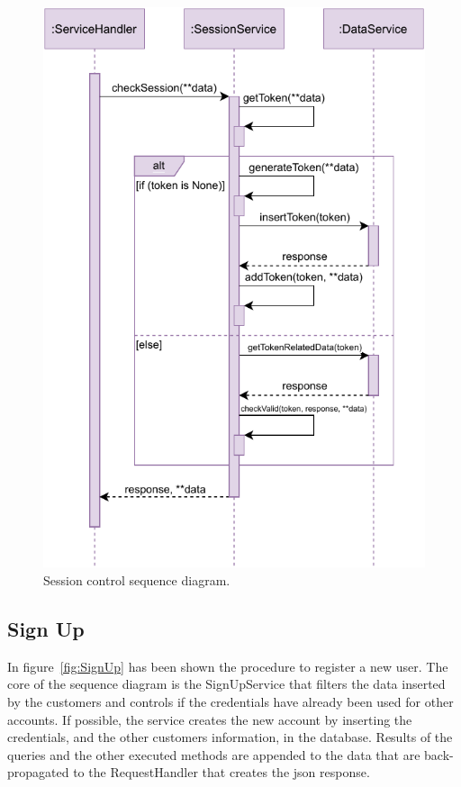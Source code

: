 \begin{figure}[H]
    \centering
    \includegraphics[width=1.0\textwidth]{images/sessionToken_sequence_diagram.pdf}
    \caption{Session control sequence diagram.}\label{fig:SessControl}
\end{figure}

\subsection{Sign Up}

In figure~\ref{fig:SignUp} has been shown the procedure to register a new user. The core of the sequence diagram is the SignUpService that filters the data inserted by the customers and controls if the credentials have already been used for other accounts. If possible, the service creates the new account by inserting the credentials, and the other customers information, in the database. Results of the queries and the other executed methods are appended to the data that are back-propagated to the RequestHandler that creates the \gls{json} response.

